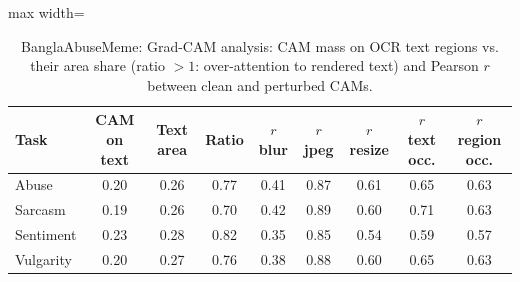 \begin{table}[t]
\centering
\small
\caption{BanglaAbuseMeme: Grad-CAM analysis: CAM mass on OCR text regions vs. their area share (ratio $>1$: over-attention to rendered text) and Pearson $r$ between clean and perturbed CAMs.}
\label{tab:gradcam_banglaabusememe}
\begin{adjustbox}{max width=\columnwidth}
\begin{tabular}{lcccccccc}
\toprule
Task & CAM on text & Text area & Ratio & $r$ blur & $r$ jpeg & $r$ resize & $r$ text occ. & $r$ region occ. \\
\midrule
Abuse & 0.20 & 0.26 & 0.77 & 0.41 & 0.87 & 0.61 & 0.65 & 0.63 \\
Sarcasm & 0.19 & 0.26 & 0.70 & 0.42 & 0.89 & 0.60 & 0.71 & 0.63 \\
Sentiment & 0.23 & 0.28 & 0.82 & 0.35 & 0.85 & 0.54 & 0.59 & 0.57 \\
Vulgarity & 0.20 & 0.27 & 0.76 & 0.38 & 0.88 & 0.60 & 0.65 & 0.63 \\
\bottomrule
\end{tabular}
\end{adjustbox}
\end{table}
